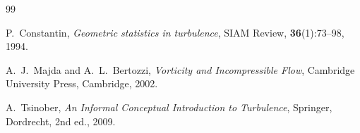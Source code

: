 \documentclass[11pt,a4paper]{article}
\theoremstyle{definition}
\begin{document}
\begin{thebibliography}{99}

P.~Constantin,
\textit{Geometric statistics in turbulence},
SIAM Review, \textbf{36}(1):73--98, 1994.

A.~J.~Majda and A.~L.~Bertozzi,
\textit{Vorticity and Incompressible Flow},
Cambridge University Press, Cambridge, 2002.

A.~Tsinober,
\textit{An Informal Conceptual Introduction to Turbulence},
Springer, Dordrecht, 2nd ed., 2009.

\end{thebibliography}
\end{document}
